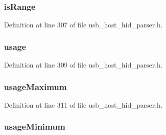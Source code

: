\subsubsection[{is\+Range}]{ is\+Range}\label{struct___h_i_d___u_s_a_g_e_i_t_e_m_adeb138fd85166f4e28653db71f8223f2}


Definition at line 307 of file usb\+\_\+host\+\_\+hid\+\_\+parser.\+h.

\hypertarget{struct___h_i_d___u_s_a_g_e_i_t_e_m_a2de656b5ffc625e0e129e11bac77b325}{}
\subsubsection[{usage}]{ usage}\label{struct___h_i_d___u_s_a_g_e_i_t_e_m_a2de656b5ffc625e0e129e11bac77b325}


Definition at line 309 of file usb\+\_\+host\+\_\+hid\+\_\+parser.\+h.

\hypertarget{struct___h_i_d___u_s_a_g_e_i_t_e_m_a86c48b81eff65a22a00da2cd9b756805}{}
\subsubsection[{usage\+Maximum}]{ usage\+Maximum}\label{struct___h_i_d___u_s_a_g_e_i_t_e_m_a86c48b81eff65a22a00da2cd9b756805}


Definition at line 311 of file usb\+\_\+host\+\_\+hid\+\_\+parser.\+h.

\hypertarget{struct___h_i_d___u_s_a_g_e_i_t_e_m_a6fb5cde3543cfe1d694b5a6413d51513}{}
\subsubsection[{usage\+Minimum}]{ usage\+Minimum}\label{struct___h_i_d___u_s_a_g_e_i_t_e_m_a6fb5cde3543cfe1d694b5a6413d51513}


